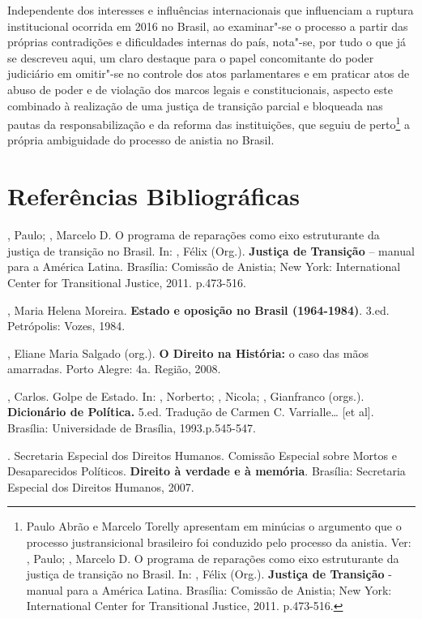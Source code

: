 Independente dos interesses e influências internacionais que influenciam
a ruptura institucional ocorrida em 2016 no Brasil, ao examinar"-se o
processo a partir das próprias contradições e dificuldades internas do
país, nota"-se, por tudo o que já se descreveu aqui, um claro destaque
para o papel concomitante do poder judiciário em omitir"-se no controle
dos atos parlamentares e em praticar atos de abuso de poder e de
violação dos marcos legais e constitucionais, aspecto este combinado à
realização de uma justiça de transição parcial e bloqueada nas pautas da
responsabilização e da reforma das instituições, que seguiu de
perto\footnote{Paulo Abrão e Marcelo Torelly apresentam em minúcias o
  argumento que o processo justransicional brasileiro foi conduzido pelo
  processo da anistia. Ver: , Paulo; , Marcelo D. O programa
  de reparações como eixo estruturante da justiça de transição no
  Brasil. In: , Félix (Org.). \textbf{Justiça de Transição} -
  manual para a América Latina. Brasília: Comissão de Anistia; New York:
  International Center for Transitional Justice, 2011. p.473-516.} a
própria ambiguidade do processo de anistia no Brasil.

\section{Referências Bibliográficas}

, Paulo; , Marcelo D. O programa de reparações como eixo
estruturante da justiça de transição no Brasil. In: , Félix
(Org.). \textbf{Justiça de Transição} -- manual para a América Latina.
Brasília: Comissão de Anistia; New York: International Center for
Transitional Justice, 2011. p.473-516.

, Maria Helena Moreira. \textbf{Estado e oposição no Brasil
(1964-1984)}. 3.ed. Petrópolis: Vozes, 1984.

, Eliane Maria Salgado (org.). \textbf{O Direito na História:}
o caso das mãos amarradas. Porto Alegre:  4a. Região, 2008.

, Carlos. Golpe de Estado. In: , Norberto; , Nicola;
, Gianfranco (orgs.). \textbf{Dicionário de Política.} 5.ed.
Tradução de Carmen C. Varrialle\ldots{} {[}et al{]}. Brasília: Universidade
de Brasília, 1993.p.545-547.

. Secretaria Especial dos Direitos Humanos. Comissão Especial
sobre Mortos e Desaparecidos Políticos. \textbf{Direito à verdade e à
memória}. Brasília: Secretaria Especial dos Direitos Humanos, 2007.

